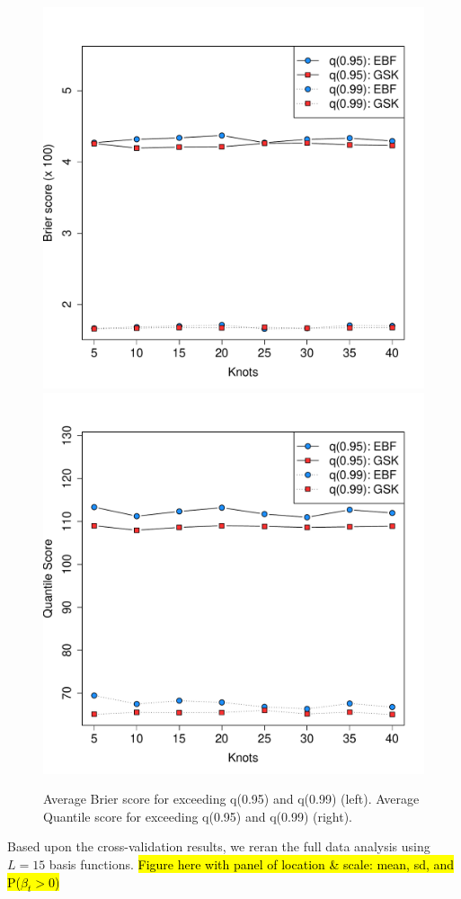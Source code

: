 \documentclass[11pt]{article}
\begin{document}
\begin{figure}  %
  \centering
  \includegraphics[width=0.47\linewidth]{plots/fire-bs}
  \includegraphics[width=0.47\linewidth]{plots/fire-qs}
  \caption{Average Brier score for exceeding q(0.95) and q(0.99) (left). Average Quantile score for exceeding q(0.95) and q(0.99) (right).}
  \label{fig:avgqscore}
\end{figure}



Based upon the cross-validation results, we reran the full data analysis using $L = 15$ basis functions.
\hl{Figure here with panel of location \& scale: mean, sd, and P($\beta_t > 0$)}
\end{document}
